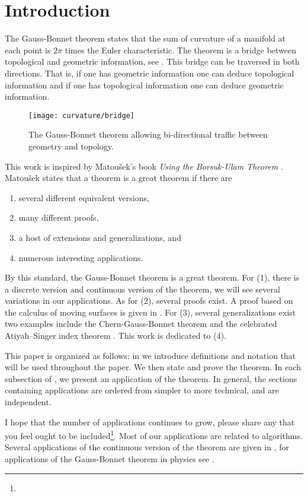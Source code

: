 \section{Introduction}
\label{sec:intro}


The Gauss-Bonnet theorem states that the sum of curvature
of a manifold at each point is $2\pi$ times the Euler characteristic.
The theorem is a bridge between topological
and geometric information, see . 
This bridge can be traversed in both directions.
That is, if one has geometric information one can deduce topological information and
if one has topological information one can deduce geometric information.


\begin{figure}[htb]
\centering
\texttt{[image: curvature/bridge]}
\caption{The Gauss-Bonnet theorem allowing bi-directional traffic
between geometry and topology.}
\label{fig:bridge}
\end{figure}

This work is inspired by Matou\v{s}ek's book \emph{Using the Borsuk-Ulam Theorem}
\cite{jm08}.
Matou\v{s}ek states that a theorem is a great theorem if there are
\begin{enumerate}[(1)]
\item several different equivalent versions,
\item many different proofs,
\item a host of extensions and generalizations, and
\item numerous interesting applications.
\end{enumerate}

By this standard, the Gauss-Bonnet theorem is a great theorem.
For (1), there is a discrete version and continuous version of the theorem,
we will see several variations in our applications.
As for (2), several proofs exist.
A proof based on the calculus of
moving surfaces is given in \cite{grinfeld_introduction_2013}.
For (3), several generalizations exist two examples include
the Chern-Gauss-Bonnet theorem \cite{chern_simple_1944} and the celebrated Atiyah–Singer index 
theorem \cite{atiyah_index_1963}.
This work is dedicated to (4).

This paper is organized as follows:
in  we introduce definitions and notation that will be used
throughout the paper. We then state and prove the theorem.
In each subsection of , we present an application of the theorem.
In general, the sections containing applications are ordered from simpler to more technical,
and are independent.


I hope that the number of applications continues to grow,
please share any that you feel
ought to be included\footnote{}.
Most of our applications are related to algorithms. 
Several applications of the continuous version of the theorem
are given in \cite{doc76,pressley_elementary_2010}, for applications of the Gauss-Bonnet 
theorem in physics see \cite{tirado-physics-apps,gibbons_applications_2008}.